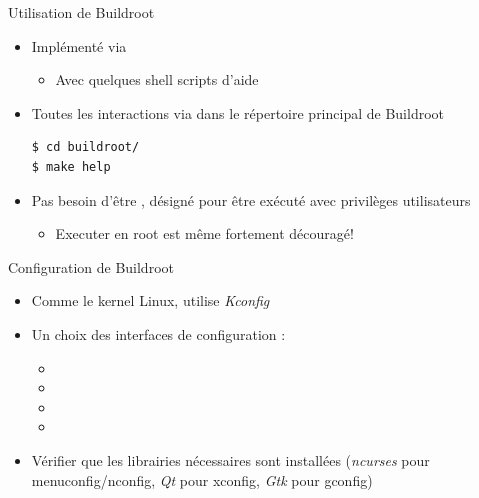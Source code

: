 \begin{frame}[fragile]{Utilisation de Buildroot}
  \begin{itemize}
  \item Implémenté via 
    \begin{itemize}
    \item Avec quelques shell scripts d'aide
    \end{itemize}
  \item Toutes les interactions via  dans le répertoire principal de Buildroot
    \begin{block}{}
\begin{verbatim}
$ cd buildroot/
$ make help
\end{verbatim}
    \end{block}
  \item Pas besoin d'être , désigné pour être exécuté avec privilèges utilisateurs
    \begin{itemize}
    \item Executer en root est même fortement découragé!
    \end{itemize}
  \end{itemize}
\end{frame}

\begin{frame}{Configuration de Buildroot}
  \begin{itemize}
  \item Comme le kernel Linux, utilise {\em Kconfig}
  \item Un choix des interfaces de configuration :
    \begin{itemize}
    \item {}
    \item {}
    \item {}
    \item {}
    \end{itemize}
  \item Vérifier que les librairies nécessaires sont installées
    ({\em ncurses} pour menuconfig/nconfig, {\em Qt} pour xconfig, {\em
      Gtk} pour gconfig)
  \end{itemize}
\end{frame}

